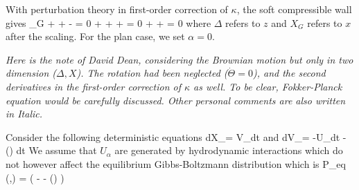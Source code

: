 \documentclass[books,12pt]{elegantpaper}
\begin{document}
With perturbation theory in first-order correction of $\kappa$, the soft compressible wall gives 
\beq {}_G +   +   -  \sin\alpha = 0  \eeq
\beq \ddot{\Delta} + \xi {} +   + \cos\alpha = 0   \eeq
\beq \ddot{\Theta} +  \frac{\dot\Theta}{\sqrt\Delta} +   = 0  \eeq
where $\Delta$ refers to $z$ and $X_G$ refers to $x$ after the scaling. For the plan case, we set $\alpha=0$. %



\textit{Here is the note of David Dean, considering the Brownian motion but only in two dimension ($\Delta, X$). The rotation had been neglected ($\dot\Theta=0$), and the second derivatives in the first-order correction of $\kappa$ as well. To be clear, Fokker-Planck equation would be carefully discussed. Other personal comments are also written in Italic.}

Consider the following deterministic equations 
\beq dX_\alpha = V_\alpha dt  \label{David.1} \eeq
and 
\beq dV_\alpha = -U_\alpha dt - \nabla \phi() dt  \eeq 
We assume that $U_\alpha$ are generated by hydrodynamic interactions which do not however affect the equilibrium Gibbs-Boltzmann distribution which is \beq P_{eq} (,) =  \exp \left( -  - \beta \phi() \right)  \eeq
\end{document}
